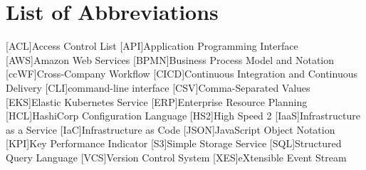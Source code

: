 \chapter*{List of Abbreviations}

\begin{acronym}[BPMN] %

	[ACL]{Access Control List}
	[API]{Application Programming Interface}
	[AWS]{Amazon Web Services}
	[BPMN]{Business Process Model and Notation}
	[ccWF]{Cross-Company Workflow}
	[CICD]{Continuous Integration and Continuous Delivery}
	[CLI]{command-line interface}
	[CSV]{Comma-Separated Values}
	[EKS]{Elastic Kubernetes Service}
	[ERP]{Enterprise Resource Planning}
	[HCL]{HashiCorp Configuration Language}
	[HS2]{High Speed 2}
	[IaaS]{Infrastructure as a Service}
	[IaC]{Infrastructure as Code}
	[JSON]{JavaScript Object Notation}
	[KPI]{Key Performance Indicator}
	[S3]{Simple Storage Service}
	[SQL]{Structured Query Language}
	[VCS]{Version Control System}
	[XES]{eXtensible Event Stream}

\end{acronym}